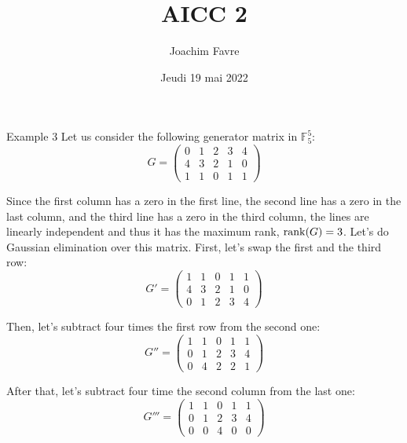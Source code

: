 \documentclass[a4paper]{article}
\title{AICC 2}
\author{Joachim Favre}
\date{Jeudi 19 mai 2022}
\begin{document}
\maketitle


\begin{parag}{Example 3}
    Let us consider the following generator matrix in $\mathbb{F}_5^5$: 
    \[G = \begin{pmatrix} 0 & 1 & 2 & 3 & 4 \\ 4 & 3 & 2 & 1 & 0 \\ 1 & 1 & 0 & 1 & 1 \end{pmatrix} \]
    
    Since the first column has a zero in the first line, the second line has a zero in the last column, and the third line has a zero in the third column, the lines are linearly independent and thus it has the maximum rank, $\rank\left(G\right) = 3$. Let's do Gaussian elimination over this matrix. First, let's swap the first and the third row:
    \[G' = \begin{pmatrix} 1 & 1 & 0 & 1 & 1 \\ 4 & 3 & 2 & 1 & 0 \\ 0 & 1 & 2 & 3 & 4 \end{pmatrix} \]

    Then, let's subtract four times the first row from the second one: 
    \[G'' = \begin{pmatrix} 1 & 1 & 0 & 1 & 1 \\ 0 & 1 & 2 & 3 & 4 \\ 0 & 4 & 2 & 2 & 1 \end{pmatrix} \]
    
    After that, let's subtract four time the second column from the last one: 
    \[G''' = \begin{pmatrix} 1 & 1 & 0 & 1 & 1 \\ 0 & 1 & 2 & 3 & 4 \\ 0 & 0 & 4 & 0 & 0 \end{pmatrix} \]
    

\end{parag}
\end{document}
